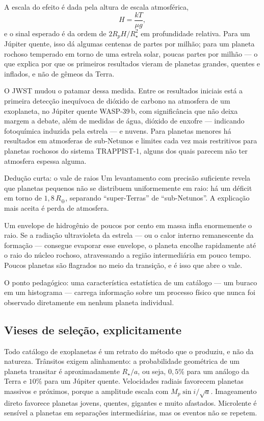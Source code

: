 \documentclass[11pt,a4paper]{article}
\begin{document}
A escala do efeito é dada pela altura de escala atmosférica,
\[
H=\frac{kT}{\mu g},
\]
e o sinal esperado é da ordem de $2R_pH/R_\star^{2}$ em profundidade relativa. Para um Júpiter quente, isso dá algumas centenas de partes por milhão; para um planeta rochoso temperado em torno de uma estrela solar, poucas partes por milhão --- o que explica por que os primeiros resultados vieram de planetas grandes, quentes e inflados, e não de gêmeos da Terra.

O JWST mudou o patamar dessa medida. Entre os resultados iniciais está a primeira detecção inequívoca de dióxido de carbono na atmosfera de um exoplaneta, no Júpiter quente WASP-39\,b, com significância que não deixa margem a debate, além de medidas de água, dióxido de enxofre --- indicando fotoquímica induzida pela estrela --- e nuvens. Para planetas menores há resultados em atmosferas de sub-Netunos e limites cada vez mais restritivos para planetas rochosos do sistema TRAPPIST-1, alguns dos quais parecem não ter atmosfera espessa alguma.

\begin{lessonblock}[borderline west={2pt}{0pt}{astroGold}]{Dedução curta: o vale de raios}
Um levantamento com precisão suficiente revela que planetas pequenos não se distribuem uniformemente em raio: há um déficit em torno de $1{,}8\,R_\oplus$, separando ``super-Terras'' de ``sub-Netunos''. A explicação mais aceita é perda de atmosfera.

Um envelope de hidrogênio de poucos por cento em massa infla enormemente o raio. Se a radiação ultravioleta da estrela --- ou o calor interno remanescente da formação --- consegue evaporar esse envelope, o planeta encolhe rapidamente até o raio do núcleo rochoso, atravessando a região intermediária em pouco tempo. Poucos planetas são flagrados no meio da transição, e é isso que abre o vale.

O ponto pedagógico: uma característica estatística de um catálogo --- um buraco em um histograma --- carrega informação sobre um processo físico que nunca foi observado diretamente em nenhum planeta individual.
\end{lessonblock}

\subsection*{Vieses de seleção, explicitamente}

Todo catálogo de exoplanetas é um retrato do método que o produziu, e não da natureza. Trânsitos exigem alinhamento: a probabilidade geométrica de um planeta transitar é aproximadamente $R_\star/a$, ou seja, $0{,}5\%$ para um análogo da Terra e $10\%$ para um Júpiter quente. Velocidades radiais favorecem planetas massivos e próximos, porque a amplitude escala com $M_p\sin i/\sqrt{a}$. Imageamento direto favorece planetas jovens, quentes, gigantes e muito afastados. Microlente é sensível a planetas em separações intermediárias, mas os eventos não se repetem.
\end{document}
